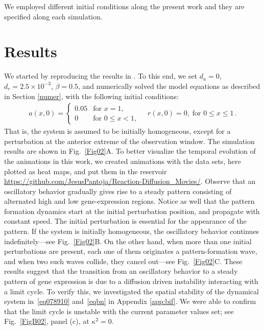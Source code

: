 \documentclass[%
 preprint,
 amsmath,amssymb,
 aps,
]{revtex4-2}
\begin{document}
	We employed different initial conditions along the present work and they are 
	specified along each simulation.

	\section{Results}
	\label{res}
	
	We started by reproducing the results in \citep{Cotterell2015}. To this end, we
	set $d_a=0$, $d_r = 2.5\times10^{-3}$, $\beta = 0.5$, and numerically solved the
	model equations as described in Section \ref{numer}, with the following initial 
	conditions:
	\begin{gather}
	a(x, 0) = \left\{\begin{array}{cl}
	0.05 & \text{for } x = 1, \\
	0 & \text{for } 0 \leq x < 1,
	\end{array} \right. 
	\quad
	r(x, 0) = 0, \; \text{for } 0 \leq x \leq 1\,.
	\end{gather}
	That is, the system is assumed to be initially homogeneous, except for a
	perturbation at the anterior extreme of the observation window.	
	The simulation results are shown in Fig.~\ref{Fig02}A. To better visualize 
	the temporal evolution of the animations in this work, we created 
	animations with the data sets, here plotted as heat maps, and put them 
	in the reservoir 
	\url{https://github.com/JesusPantoja/Reaction-Diffusion_Movies/}. 
	Observe that an oscillatory behavior
	gradually gives rise to a steady pattern consisting of alternated high and low
	gene-expression regions. Notice as well that the pattern formation dynamics start at
	the initial perturbation position, and propagate with constant speed. The
	initial perturbation is essential for the appearance of the pattern. If the
	system is initially homogeneous, the oscillatory behavior continues
	indefinitely---see Fig.~\ref{Fig02}B. On the other hand, when more than one
	initial perturbations are present, each one of them originates a
	pattern-formation wave, and when two such waves collide, they cancel out---see 
	Fig.~\ref{Fig02}C. These results suggest that the transition from an
	oscillatory behavior to a steady pattern of gene expression is due to a
	diffusion driven instability interacting with a limit cycle. To verify this,
	we investigated the spatial stability of the dynamical system
	in~\eqref{eq078910} and~\eqref{eqbn} in
	Appendix \ref{app:bif}. We were able to confirm
	that the limit cycle is unstable with the current parameter values set; see
	Fig.~\ref{FigB02}, panel (c), at $\kappa^2=0$.
	
\end{document}
